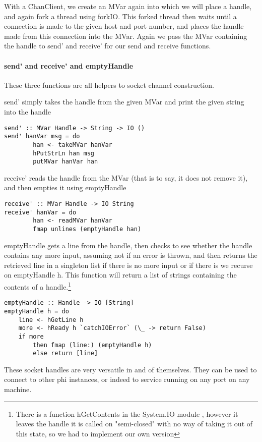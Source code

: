 With a ChanClient, we create an MVar again into which we will place a handle, and again fork a thread using forkIO. This forked thread then waits until a connection is made to the given host and port number, and places the handle made from this connection into the MVar. Again we pass the MVar containing the handle to send' and receive' for our send and receive functions.

\paragraph{send' and receive' and emptyHandle}

These three functions are all helpers to socket channel construction.

send' simply takes the handle from the given MVar and print the given string into the handle
\begin{verbatim}
send' :: MVar Handle -> String -> IO ()
send' hanVar msg = do
        han <- takeMVar hanVar
        hPutStrLn han msg
        putMVar hanVar han
\end{verbatim}

receive' reads the handle from the MVar (that is to say, it does not remove it), and then empties it using emptyHandle
\begin{verbatim}
receive' :: MVar Handle -> IO String
receive' hanVar = do
        han <- readMVar hanVar
        fmap unlines (emptyHandle han)
\end{verbatim}

emptyHandle gets a line from the handle, then checks to see whether the handle contains any more input, assuming not if an error is thrown, and then returns the retrieved line in a singleton list if there is no more input or if there is we recurse on emptyHandle h. This function will return a list of strings containing the contents of a handle.\footnote{There is a function hGetContents in the System.IO module \cite{hack:io}, however it leaves the handle it is called on "semi-closed" with
no way of taking it out of this state, so we had to implement our own version}
\begin{verbatim}
emptyHandle :: Handle -> IO [String]
emptyHandle h = do
    line <- hGetLine h
    more <- hReady h `catchIOError` (\_ -> return False)
    if more
        then fmap (line:) (emptyHandle h)
        else return [line]
\end{verbatim}

These socket handles are very versatile in and of themselves. They can be used to connect to other phi instances, or indeed to service running on any port on any machine.

